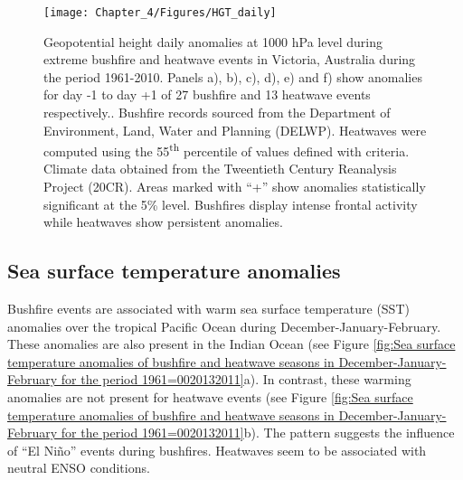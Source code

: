 \begin{figure}[h]
\noindent \begin{centering}
\texttt{[image: Chapter\_4/Figures/HGT\_daily]}
\par\end{centering}

\caption[Geopotential height daily anomalies at 1000 hPa level during extreme
bushfire and heatwave events in Victoria, Australia during the period
1961-2010]{Geopotential height daily anomalies at 1000 hPa level during extreme
bushfire and heatwave events in Victoria, Australia during the period
1961-2010. Panels a), b), c), d), e) and f) show anomalies for day
-1 to day +1 of 27 bushfire and 13 heatwave events respectively..
Bushfire records sourced from the Department of Environment, Land,
Water and Planning (DELWP). Heatwaves were computed using the 55\protect\textsuperscript{th}
percentile of values defined with \citet{Nairn2009} criteria. Climate
data obtained from the Tweentieth Century Reanalysis Project (20CR).
Areas marked with ``+'' show anomalies statistically significant
at the 5\% level. Bushfires display intense frontal activity while
heatwaves show persistent anomalies. \label{fig: Geopotential height daily anomalies at 1000 hPa level during extreme bushfire and heatwave events in Victoria, Australia during the period 1961-2010}}


\end{figure}



\subsection{Sea surface temperature anomalies }

Bushfire events are associated with warm sea surface temperature (SST)
anomalies over the tropical Pacific Ocean during December-January-February.
These anomalies are also present in the Indian Ocean (see Figure \ref{fig:Sea surface temperature anomalies of bushfire and heatwave seasons in December-January-February for the period 1961=0020132011}a).
In contrast, these warming anomalies are not present for heatwave
events (see Figure \ref{fig:Sea surface temperature anomalies of bushfire and heatwave seasons in December-January-February for the period 1961=0020132011}b).
The pattern suggests the influence of ``El Ni\~no'' events during
bushfires. Heatwaves seem to be associated with neutral ENSO conditions. 

